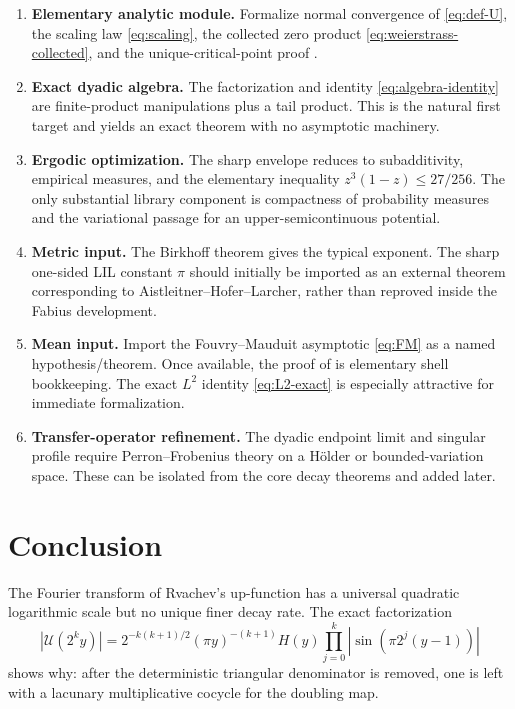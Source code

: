 \documentclass[11pt,oneside]{article}
\theoremstyle{definition}
\theoremstyle{remark}
\newcommand{\Uhat}{\mathcal U}
\begin{document}
\begin{enumerate}
\item \textbf{Elementary analytic module.}
Formalize normal convergence of \eqref{eq:def-U}, the scaling law
\eqref{eq:scaling}, the collected zero product \eqref{eq:weierstrass-collected}, and the
unique-critical-point proof .

\item \textbf{Exact dyadic algebra.}
The factorization  and identity
\eqref{eq:algebra-identity} are finite-product manipulations plus a tail product.  This
is the natural first target and yields an exact theorem with no asymptotic machinery.

\item \textbf{Ergodic optimization.}
The sharp envelope reduces to subadditivity, empirical measures, and the elementary
inequality $z^3(1-z)\le27/256$.  The only substantial library component is compactness of
probability measures and the variational passage for an upper-semicontinuous potential.

\item \textbf{Metric input.}
The Birkhoff theorem gives the typical exponent.  The sharp one-sided LIL constant $\pi$ should
initially be imported as an external theorem corresponding to Aistleitner--Hofer--Larcher,
rather than reproved inside the Fabius development.

\item \textbf{Mean input.}
Import the Fouvry--Mauduit asymptotic \eqref{eq:FM} as a named hypothesis/theorem.
Once available, the proof of  is elementary shell bookkeeping.
The exact $L^2$ identity \eqref{eq:L2-exact} is especially attractive for immediate
formalization.

\item \textbf{Transfer-operator refinement.}
The dyadic endpoint limit and singular profile require Perron--Frobenius theory on a
H\"older or bounded-variation space.  These can be isolated from the core decay theorems
and added later.
\end{enumerate}

\section{Conclusion}

The Fourier transform of Rvachev's up-function has a universal quadratic logarithmic
scale but no unique finer decay rate.  The exact factorization
\[
 |\Uhat(2^ky)|
 =2^{-k(k+1)/2}(\pi y)^{-(k+1)}H(y)
 \prod_{j=0}^{k}|\sin(\pi2^j(y-1))|
\]
shows why: after the deterministic triangular denominator is removed, one is left with a
lacunary multiplicative cocycle for the doubling map.
\end{document}
